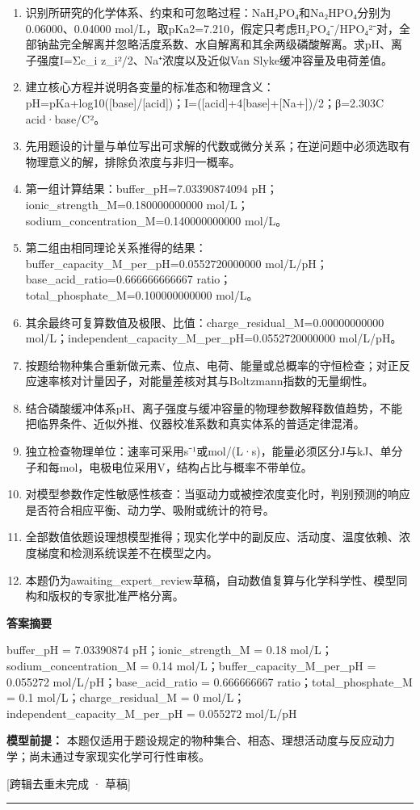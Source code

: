 \documentclass[UTF8,11pt,a4paper]{ctexart}
\begin{document}
\begin{enumerate}
\item 识别所研究的化学体系、约束和可忽略过程：NaH₂PO₄和Na₂HPO₄分别为0.06000、0.04000 mol/L，取pKa2=7.210，假定只考虑H₂PO₄⁻/HPO₄²⁻对，全部钠盐完全解离并忽略活度系数、水自解离和其余两级磷酸解离。求pH、离子强度I=Σc\_i z\_i²/2、Na⁺浓度以及近似Van Slyke缓冲容量及电荷差值。
\item 建立核心方程并说明各变量的标准态和物理含义：pH=pKa+log10([base]/[acid])；I=([acid]+4[base]+[Na+])/2；β=2.303C acid·base/C²。
\item 先用题设的计量与单位写出可求解的代数或微分关系；在逆问题中必须选取有物理意义的解，排除负浓度与非归一概率。
\item 第一组计算结果：buffer\_pH=7.03390874094 pH；ionic\_strength\_M=0.180000000000 mol/L；sodium\_concentration\_M=0.140000000000 mol/L。
\item 第二组由相同理论关系推得的结果：buffer\_capacity\_M\_per\_pH=0.0552720000000 mol/L/pH；base\_acid\_ratio=0.666666666667 ratio；total\_phosphate\_M=0.100000000000 mol/L。
\item 其余最终可复算数值及极限、比值：charge\_residual\_M=0.00000000000 mol/L；independent\_capacity\_M\_per\_pH=0.0552720000000 mol/L/pH。
\item 按题给物种集合重新做元素、位点、电荷、能量或总概率的守恒检查；对正反应速率核对计量因子，对能量差核对其与Boltzmann指数的无量纲性。
\item 结合磷酸缓冲体系pH、离子强度与缓冲容量的物理参数解释数值趋势，不能把临界条件、近似外推、仪器校准系数和真实体系的普适定律混淆。
\item 独立检查物理单位：速率可采用s⁻¹或mol/(L·s)，能量必须区分J与kJ、单分子和每mol，电极电位采用V，结构占比与概率不带单位。
\item 对模型参数作定性敏感性核查：当驱动力或被控浓度变化时，判别预测的响应是否符合相应平衡、动力学、吸附或统计的符号。
\item 全部数值依题设理想模型推得；现实化学中的副反应、活动度、温度依赖、浓度梯度和检测系统误差不在模型之内。
\item 本题仍为awaiting\_expert\_review草稿，自动数值复算与化学科学性、模型同构和版权的专家批准严格分离。
\end{enumerate}
\noindent\textbf{答案摘要}\par
buffer\_pH = 7.03390874 pH；ionic\_strength\_M = 0.18 mol/L；sodium\_concentration\_M = 0.14 mol/L；buffer\_capacity\_M\_per\_pH = 0.055272 mol/L/pH；base\_acid\_ratio = 0.666666667 ratio；total\_phosphate\_M = 0.1 mol/L；charge\_residual\_M = 0 mol/L；independent\_capacity\_M\_per\_pH = 0.055272 mol/L/pH\par
\noindent\textbf{模型前提：}
本题仅适用于题设规定的物种集合、相态、理想活动度与反应动力学；尚未通过专家现实化学可行性审核。\par
\noindent\textcolor{red!65!black}{[跨辑去重未完成 · 草稿]} \par
\medskip\hrule\medskip
{}
\end{document}
